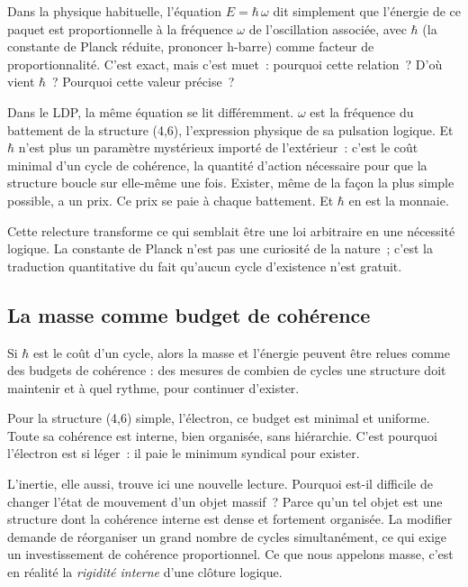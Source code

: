 \documentclass[12pt, a4paper, openright]{book}
\begin{document}
\medskip

Dans la physique habituelle, l'équation $E = \hbar\,\omega$ dit simplement que l'énergie de ce paquet est proportionnelle à la fréquence $\omega$ de l'oscillation associée, avec $\hbar$ (la constante de Planck réduite, prononcer \og h-barre\fg{}) comme facteur de proportionnalité. C'est exact, mais c'est muet~: pourquoi cette relation~? D'où vient $\hbar$~? Pourquoi cette valeur précise~?

\medskip

Dans le LDP, la même équation se lit différemment. $\omega$ est la fréquence du battement de la structure (4,6), l'expression physique de sa pulsation logique. Et $\hbar$ n'est plus un paramètre mystérieux importé de l'extérieur~: c'est le coût minimal d'un cycle de cohérence, la quantité d'action nécessaire pour que la structure boucle sur elle-même une fois. Exister, même de la façon la plus simple possible, a un prix. Ce prix se paie à chaque battement. Et $\hbar$ en est la monnaie.

\medskip

Cette relecture transforme ce qui semblait être une loi arbitraire en une nécessité logique. La constante de Planck n'est pas une curiosité de la nature~; c'est la traduction quantitative du fait qu'aucun cycle d'existence n'est gratuit.

\subsection*{La masse comme budget de cohérence}

Si $\hbar$ est le coût d'un cycle, alors la masse et l'énergie peuvent être relues comme des budgets de cohérence : des mesures de combien de cycles une structure doit maintenir et à quel rythme, pour continuer d'exister.

\medskip

Pour la structure (4,6) simple, l'électron, ce budget est minimal et uniforme. Toute sa cohérence est interne, bien organisée, sans hiérarchie. C'est pourquoi l'électron est si léger~: il paie le minimum syndical pour exister.

\medskip

L'inertie, elle aussi, trouve ici une nouvelle lecture. Pourquoi est-il difficile de changer l'état de mouvement d'un objet massif~? Parce qu'un tel objet est une structure dont la cohérence interne est dense et fortement organisée. La modifier demande de réorganiser un grand nombre de cycles simultanément, ce qui exige un investissement de cohérence proportionnel. Ce que nous appelons masse, c'est en réalité la \emph{rigidité interne} d'une clôture logique.
\end{document}
